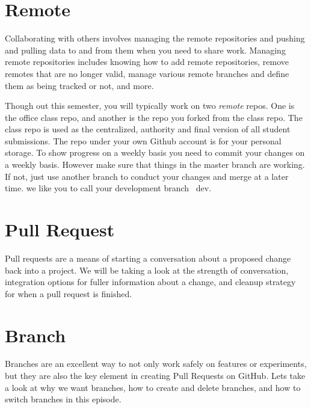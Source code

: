
\section{Remote}\label{remote}

Collaborating with others involves managing the remote repositories
and pushing and pulling data to and from them when you need to share
work. Managing remote repositories includes knowing how to add remote
repositories, remove remotes that are no longer valid, manage various
remote branches and define them as being tracked or not, and more.

Though out this semester, you will typically work on two {\em remote} repos.
One is the office class repo, and another is the repo you forked from
the class repo. The class repo is used as the centralized, authority and
final version of all student submissions. The repo under your own Github
account is for your personal storage. To show progress on a weekly
basis you need to commit your changes on a weekly basis. However make
sure that things in the master branch are working. If not, just use
another branch to conduct your changes and merge at a later
time. we like you to call your development branch {\ dev}.


\section{Pull Request}\label{pull-request}

Pull requests are a means of starting a conversation about a proposed
change back into a project. We will be taking a look at the strength of
conversation, integration options for fuller information about a change,
and cleanup strategy for when a pull request is finished.


\section{Branch}\label{branch}

Branches are an excellent way to not only work safely on features or
experiments, but they are also the key element in creating Pull Requests
on GitHub. Lets take a look at why we want branches, how to create and
delete branches, and how to switch branches in this episode.

